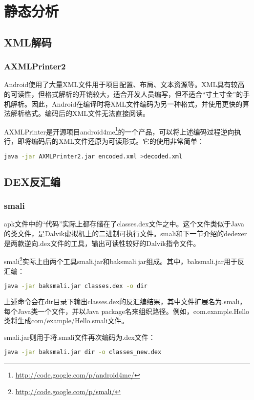 \chapter{静态分析}
\section{XML解码}
\subsection{AXMLPrinter2}
Android使用了大量XML文件用于项目配置、布局、文本资源等。XML具有较高的可读性，但格式解析的开销较大，适合开发人员编写，但不适合“寸土寸金”的手机解析。因此，Android在编译时将XML文件编码为另一种格式，并使用更快的算法解析格式。编码后的XML文件无法直接阅读。

AXMLPrinter是开源项目android4me\footnote{\href{http://code.google.com/p/android4me/}{http://code.google.com/p/android4me/}}的一个产品，可以将上述编码过程逆向执行，即将编码后的XML文件还原为可读形式。它的使用非常简单：
\begin{lstlisting}[language=bash, numbers=none]
java -jar AXMLPrinter2.jar encoded.xml >decoded.xml
\end{lstlisting}
\section{DEX反汇编}
\subsection{smali}
apk文件中的“代码”实际上都存储在了classes.dex文件之中。这个文件类似于Java的类文件，是Dalvik虚拟机上的二进制可执行文件。smali和下一节介绍的dedexer是两款逆向.dex文件的工具，输出可读性较好的Dalvik指令文件。

smali\footnote{\url{http://code.google.com/p/smali/}}实际上由两个工具smali.jar和baksmali.jar组成。其中，baksmali.jar用于反汇编：
\begin{lstlisting}[language=bash, numbers=none]
java -jar baksmali.jar classes.dex -o dir
\end{lstlisting}
上述命令会在dir目录下输出classes.dex的反汇编结果，其中文件扩展名为.smali，每个Java类一个文件，并以Java package名来组织路径。例如，com.example.Hello类将生成com/example/Hello.smali文件。

smali.jar则用于将.smali文件再次编码为.dex文件：
\begin{lstlisting}[language=bash, numbers=none]
java -jar baksmali.jar dir -o classes_new.dex
\end{lstlisting}

